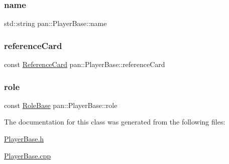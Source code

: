 \mbox{\label{classpan_1_1_player_base_a95bf8887210003d8780dec9d84743a64}} 
\subsubsection{\texorpdfstring{name}{name}}
{\footnotesize\ttfamily std\+::string pan\+::\+Player\+Base\+::name\hspace{0.3cm}{\ttfamily [protected]}}

\mbox{\label{classpan_1_1_player_base_ae222fd3f8e044135bcc5d52fdd786804}} 
\subsubsection{\texorpdfstring{reference\+Card}{referenceCard}}
{\footnotesize\ttfamily const \hyperlink{classpan_1_1_reference_card}{Reference\+Card} pan\+::\+Player\+Base\+::reference\+Card}

\mbox{\label{classpan_1_1_player_base_a63c1e92022a4eb34dc3a59d516ee6cea}} 
\subsubsection{\texorpdfstring{role}{role}}
{\footnotesize\ttfamily const \hyperlink{classpan_1_1_role_base}{Role\+Base} pan\+::\+Player\+Base\+::role}



The documentation for this class was generated from the following files\+:\begin{DoxyCompactItemize}
\item 
\hyperlink{_player_base_8h}{Player\+Base.\+h}\item 
\hyperlink{_player_base_8cpp}{Player\+Base.\+cpp}\end{DoxyCompactItemize}
